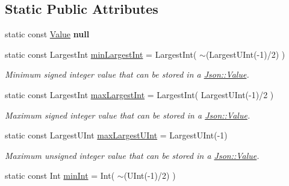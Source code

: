 \subsection*{Static Public Attributes}
\begin{DoxyCompactItemize}
\item 
\hypertarget{class_json_1_1_value_a57d8e12306732c80d1719206fcc59b22}{static const \hyperlink{class_json_1_1_value}{Value} {\bfseries null}}\label{class_json_1_1_value_a57d8e12306732c80d1719206fcc59b22}

\item 
\hypertarget{class_json_1_1_value_af91df130daa50dd43d2cd89e6ee67706}{static const Largest\-Int \hyperlink{class_json_1_1_value_af91df130daa50dd43d2cd89e6ee67706}{min\-Largest\-Int} = Largest\-Int( $\sim$(Largest\-U\-Int(-\/1)/2) )}\label{class_json_1_1_value_af91df130daa50dd43d2cd89e6ee67706}

\begin{DoxyCompactList}\small\item\em Minimum signed integer value that can be stored in a \hyperlink{class_json_1_1_value}{Json\-::\-Value}. \end{DoxyCompactList}\item 
\hypertarget{class_json_1_1_value_a8b4977696f13296fa8755c7953fafb2f}{static const Largest\-Int \hyperlink{class_json_1_1_value_a8b4977696f13296fa8755c7953fafb2f}{max\-Largest\-Int} = Largest\-Int( Largest\-U\-Int(-\/1)/2 )}\label{class_json_1_1_value_a8b4977696f13296fa8755c7953fafb2f}

\begin{DoxyCompactList}\small\item\em Maximum signed integer value that can be stored in a \hyperlink{class_json_1_1_value}{Json\-::\-Value}. \end{DoxyCompactList}\item 
\hypertarget{class_json_1_1_value_a8ddb32d9d55fa5323ae5135639dc2e31}{static const Largest\-U\-Int \hyperlink{class_json_1_1_value_a8ddb32d9d55fa5323ae5135639dc2e31}{max\-Largest\-U\-Int} = Largest\-U\-Int(-\/1)}\label{class_json_1_1_value_a8ddb32d9d55fa5323ae5135639dc2e31}

\begin{DoxyCompactList}\small\item\em Maximum unsigned integer value that can be stored in a \hyperlink{class_json_1_1_value}{Json\-::\-Value}. \end{DoxyCompactList}\item 
\hypertarget{class_json_1_1_value_a7df8a39e2502b8c92a6a41e3d752d2c8}{static const Int \hyperlink{class_json_1_1_value_a7df8a39e2502b8c92a6a41e3d752d2c8}{min\-Int} = Int( $\sim$(U\-Int(-\/1)/2) )}\label{class_json_1_1_value_a7df8a39e2502b8c92a6a41e3d752d2c8}


\end{DoxyCompactItemize}
